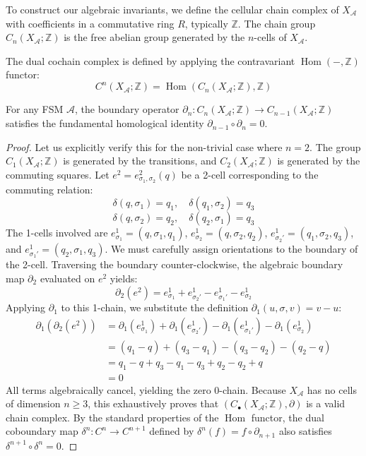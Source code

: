 To construct our algebraic invariants, we define the cellular chain complex of $X_\mathcal{A}$ with coefficients in a commutative ring $R$, typically $\mathbb{Z}$. The chain group $C_n(X_\mathcal{A}; \mathbb{Z})$ is the free abelian group generated by the $n$-cells of $X_\mathcal{A}$.

The dual cochain complex is defined by applying the contravariant $\operatorname{Hom}(-, \mathbb{Z})$ functor:
\[ C^n(X_\mathcal{A}; \mathbb{Z}) = \operatorname{Hom}(C_n(X_\mathcal{A}; \mathbb{Z}), \mathbb{Z}) \]

\begin{lemma}
For any FSM $\mathcal{A}$, the boundary operator $\partial_n : C_n(X_\mathcal{A}; \mathbb{Z}) \to C_{n-1}(X_\mathcal{A}; \mathbb{Z})$ satisfies the fundamental homological identity $\partial_{n-1} \circ \partial_n = 0$.
\end{lemma}
\begin{proof}
Let us explicitly verify this for the non-trivial case where $n=2$. The group $C_1(X_\mathcal{A}; \mathbb{Z})$ is generated by the transitions, and $C_2(X_\mathcal{A}; \mathbb{Z})$ is generated by the commuting squares.
Let $e^2 = e^2_{\sigma_1, \sigma_2}(q)$ be a 2-cell corresponding to the commuting relation:
\[ \delta(q, \sigma_1) = q_1, \quad \delta(q_1, \sigma_2) = q_3 \]
\[ \delta(q, \sigma_2) = q_2, \quad \delta(q_2, \sigma_1) = q_3 \]
The 1-cells involved are $e^1_{\sigma_1} = (q, \sigma_1, q_1)$, $e^1_{\sigma_2} = (q, \sigma_2, q_2)$, $e^1_{\sigma_2'} = (q_1, \sigma_2, q_3)$, and $e^1_{\sigma_1'} = (q_2, \sigma_1, q_3)$.
We must carefully assign orientations to the boundary of the 2-cell. Traversing the boundary counter-clockwise, the algebraic boundary map $\partial_2$ evaluated on $e^2$ yields:
\[ \partial_2(e^2) = e^1_{\sigma_1} + e^1_{\sigma_2'} - e^1_{\sigma_1'} - e^1_{\sigma_2} \]
Applying $\partial_1$ to this 1-chain, we substitute the definition $\partial_1(u, \sigma, v) = v - u$:
\begin{align*}
\partial_1(\partial_2(e^2)) &= \partial_1(e^1_{\sigma_1}) + \partial_1(e^1_{\sigma_2'}) - \partial_1(e^1_{\sigma_1'}) - \partial_1(e^1_{\sigma_2}) \\
&= (q_1 - q) + (q_3 - q_1) - (q_3 - q_2) - (q_2 - q) \\
&= q_1 - q + q_3 - q_1 - q_3 + q_2 - q_2 + q \\
&= 0
\end{align*}
All terms algebraically cancel, yielding the zero 0-chain. Because $X_\mathcal{A}$ has no cells of dimension $n \ge 3$, this exhaustively proves that $(C_\bullet(X_\mathcal{A}; \mathbb{Z}), \partial)$ is a valid chain complex. By the standard properties of the $\operatorname{Hom}$ functor, the dual coboundary map $\delta^n : C^n \to C^{n+1}$ defined by $\delta^n(f) = f \circ \partial_{n+1}$ also satisfies $\delta^{n+1} \circ \delta^n = 0$.
\end{proof}


